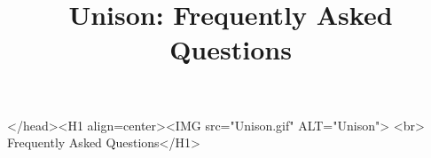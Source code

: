 \documentclass{article}
\title{Unison: Frequently Asked Questions}
\begin{document}
\begin{rawhtml}
</head><H1 align=center><IMG src="Unison.gif" ALT="Unison">
<br>
Frequently Asked Questions</H1>
\end{rawhtml}

 
\end{document}
